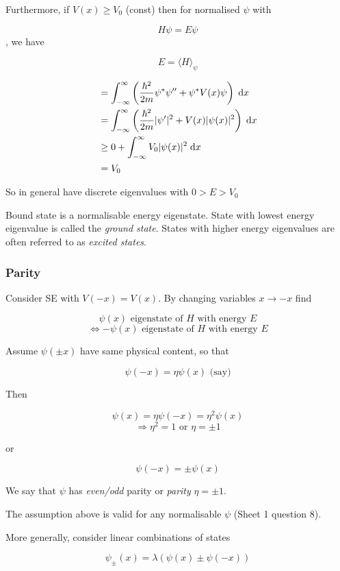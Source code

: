 \documentclass[a4paper]{article}
\begin{document}
Furthermore, if $V(x) \geq V_{0} $ (const) then for normalised $ \psi $ with 

\[ H \psi = E \psi \], we have 

\[ E = \langle H \rangle_{\psi} \]

\begin{align*}
& = \int_{-\infty}^{\infty}  \left(  \frac{\hbar^{2}}{2m} \psi^{*} \psi '' + \psi^{*}  V(x) \psi \right) \; \mathrm{d} x   \\
& = \int_{-\infty}^{\infty}  \left(  \frac{\hbar^{2}}{2m} | \psi' |^{2} + V(x) | \psi(x) |^{2} \right) \; \mathrm{d} x \\
& \geq 0 + \int_{-\infty}^{\infty} V_{0} | \psi(x) |^{2} \; \mathrm{d} x \\
& = V_{0}
\end{align*}

So in general have discrete eigenvalues with $ 0 > E > V_{0} $




Bound state is a normalisable energy eigenstate. State with lowest energy eigenvalue is called the \emph{ground state}. States with higher energy eigenvalues are often referred to as \emph{excited states}.

\subsubsection{Parity}

Consider SE with $ V(-x) = V(x) $. By changing variables $ x \to -x $ find

\[ \psi(x) \text{ eigenstate of } H \text{ with energy } E \]
\[ \iff -\psi(x) \text{ eigenstate of } H \text{ with energy } E \]

Assume $ \psi(\pm x) $ have same physical content, so that

\[ \psi(-x) = \eta \psi(x) \text{ (say)} \]

Then

\[ \psi(x) = \eta \psi(-x) = \eta^{2} \psi(x) \]
\[ \Rightarrow \eta^{2} = 1 \text{ or } \eta = \pm 1  \]

or 

\[ \psi(-x) = \pm \psi(x) \]

We say that $ \psi $ has \emph{even/odd} parity or \emph{parity} $ \eta = \pm 1 $.

The assumption above is valid for any normalisable $ \psi $ (Sheet 1 question 8).

More generally, consider linear combinations of states 

\[ \psi_{\pm}(x) = \lambda \left(   \psi(x) \pm \psi(-x ) \right) \] 
\end{document}
